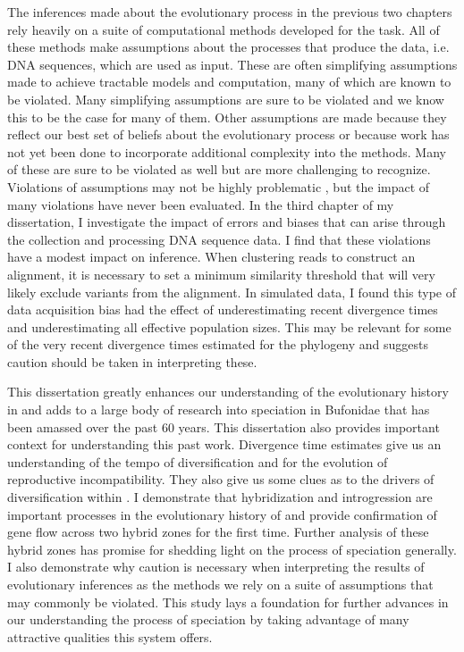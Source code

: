 The inferences made about the evolutionary process in the previous two chapters
rely heavily on a suite of computational methods developed for the task. 
All of these methods make assumptions about the processes that produce the 
data, i.e. DNA sequences, which are used as input. 
These are often simplifying assumptions made to achieve tractable models and 
computation, many of which are known to be violated.
Many simplifying assumptions are sure to be violated and we know this to be the case for many of them.
Other assumptions are made because they reflect our best set of beliefs about 
the evolutionary process or because work has not yet been done to incorporate 
additional complexity into the methods. 
Many of these are sure to be violated as well but are more challenging to
recognize.
Violations of assumptions may not be highly problematic \parencite{oaks2020},
but the impact of many violations have never been evaluated. 
In the third chapter of my dissertation, I investigate the impact of 
errors and biases that can arise through the collection and processing DNA sequence data.
I find that these violations have a modest impact on inference. 
When clustering reads to construct an alignment, it is necessary to set a minimum  
similarity threshold that will very likely exclude variants from the alignment. 
In simulated data, I found this type of data acquisition bias had the effect of
underestimating recent divergence times and underestimating 
all effective population sizes.
This may be relevant for some of the very recent divergence times estimated for 
the \anaxyrus phylogeny and suggests caution should be taken in interpreting these. 


This dissertation greatly enhances our understanding of the evolutionary history in \anaxyrus
and adds to a large body of research into speciation in Bufonidae that has been 
amassed over the past 60 years.
This dissertation also provides important context for understanding this past work.
Divergence time estimates give us an understanding of the tempo of diversification and for the evolution
of reproductive incompatibility.  
They also give us some clues as to the drivers of diversification within \anaxyrus.
I demonstrate that hybridization and introgression are important processes in 
the evolutionary history of \anaxyrus and provide confirmation of gene flow across
two hybrid zones for the first time.
Further analysis of these hybrid zones has promise for shedding light on the process
of speciation generally.
I also demonstrate why caution is necessary when interpreting the results of 
evolutionary inferences as the methods we rely on a suite of assumptions that
may commonly be violated.
This study lays a foundation for further advances in our understanding 
the process of speciation by taking advantage of many attractive qualities
this system offers.

